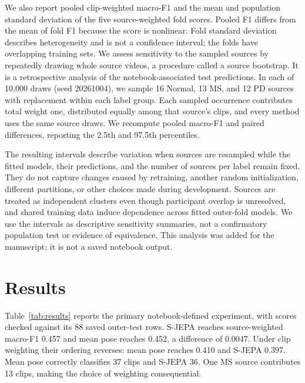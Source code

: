 \documentclass[10pt,twocolumn,letterpaper]{article}
\begin{document}
We also report pooled clip-weighted macro-F1 and the mean and population standard deviation of the five source-weighted fold scores. Pooled F1 differs from the mean of fold F1 because the score is nonlinear. Fold standard deviation describes heterogeneity and is not a confidence interval; the folds have overlapping training sets. We assess sensitivity to the sampled sources by repeatedly drawing whole source videos, a procedure called a source bootstrap. It is a retrospective analysis of the notebook-associated test predictions. In each of 10,000 draws (seed 20261004), we sample 16 Normal, 13 MS, and 12 PD sources with replacement within each label group. Each sampled occurrence contributes total weight one, distributed equally among that source's clips, and every method uses the same source draws. We recompute pooled macro-F1 and paired differences, reporting the 2.5th and 97.5th percentiles.

The resulting intervals describe variation when sources are resampled while the fitted models, their predictions, and the number of sources per label remain fixed. They do not capture changes caused by retraining, another random initialization, different partitions, or other choices made during development. Sources are treated as independent clusters even though participant overlap is unresolved, and shared training data induce dependence across fitted outer-fold models. We use the intervals as descriptive sensitivity summaries, not a confirmatory population test or evidence of equivalence. This analysis was added for the manuscript; it is not a saved notebook output.

\section{Results}
Table~\ref{tab:results} reports the primary notebook-defined experiment, with scores checked against its 88 saved outer-test rows. S-JEPA reaches source-weighted macro-F1 0.457 and mean pose reaches 0.452, a difference of 0.0047. Under clip weighting their ordering reverses: mean pose reaches 0.410 and S-JEPA 0.397. Mean pose correctly classifies 37 clips and S-JEPA 36. One MS source contributes 13 clips, making the choice of weighting consequential.
\end{document}
